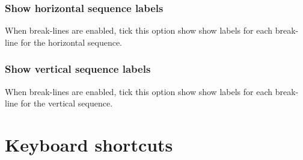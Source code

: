 \documentclass[letterpaper]{article}
\begin{document}
\bigskip

{\color[rgb]{0.30980393,0.5058824,0.7411765}\subsubsection[Show horizontal sequence labels]{Show horizontal sequence labels}}
{When break-lines are enabled, tick this option show show labels for each
break-line for the horizontal sequence.}

\bigskip

{\color[rgb]{0.30980393,0.5058824,0.7411765}\subsubsection[Show vertical sequence labels]{Show vertical sequence labels}}
{When break-lines are enabled, tick this option show show labels for each
break-line for the vertical sequence.}

\bigskip

{\color[rgb]{0.0,0.27058825,0.5254902}\section[Keyboard shortcuts]{Keyboard shortcuts}}
\end{document}
